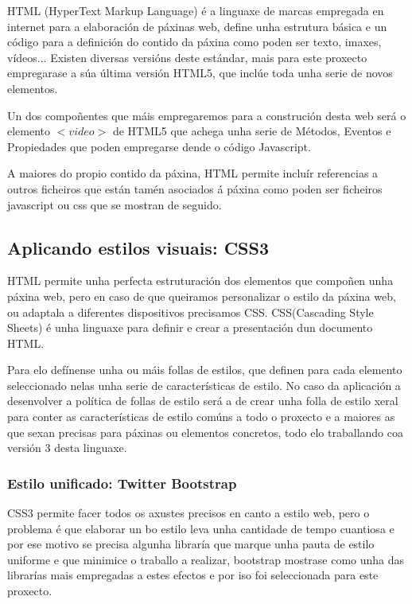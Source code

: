         HTML (HyperText Markup Language) é a linguaxe de marcas empregada en internet para a elaboración
        de páxinas web, define unha estrutura básica e un código para a definición do contido da páxina
        como poden ser texto, imaxes, vídeos... Existen diversas versións deste estándar, mais para este
        proxecto empregarase a súa última versión HTML5, que inclúe toda unha serie de novos elementos.
        
        Un dos compoñentes que máis empregaremos para a construción desta web será o elemento 
        $<video>$ de HTML5 que achega unha serie de Métodos, Eventos e Propiedades
        \cite{w3school-video-events} que poden empregarse dende o código Javascript.
        
        A maiores do propio contido da páxina, HTML permite incluír referencias a outros ficheiros que 
        están tamén asociados á páxina como poden ser ficheiros javascript ou css que se mostran de 
        seguido.
    
    \subsection{Aplicando estilos visuais: CSS3}
        HTML permite unha perfecta estruturación dos elementos que compoñen unha páxina web, pero 
        en caso de que queiramos personalizar o estilo da páxina web, ou adaptala a diferentes 
        dispositivos precisamos CSS. CSS(Cascading Style Sheets) é unha linguaxe para definir e 
        crear a presentación dun documento HTML.
        
        Para elo defínense unha ou máis follas de estilos, que definen para cada elemento 
        seleccionado nelas unha serie de características de estilo. No caso da aplicación a 
        desenvolver a política de follas de estilo será a de crear unha folla de estilo xeral para 
        conter as características de estilo comúns a todo o proxecto e a maiores as que sexan 
        precisas para páxinas ou elementos concretos, todo elo traballando coa versión 3 desta linguaxe.
        
        \subsubsection{Estilo unificado: Twitter Bootstrap}
            CSS3 permite facer todos os axustes precisos en canto a estilo web, pero o problema é 
            que elaborar un bo estilo leva unha cantidade de tempo cuantiosa e por ese motivo se 
            precisa algunha libraría que marque unha pauta de estilo uniforme e que minimice o 
            traballo a realizar, bootstrap mostrase como unha das librarías mais empregadas a estes
            efectos e por iso foi seleccionada para este proxecto.
        

